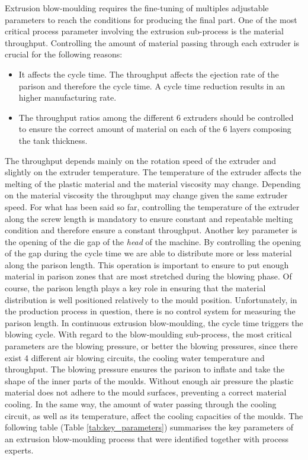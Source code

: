 Extrusion blow-moulding requires the fine-tuning of multiples adjustable parameters to reach the conditions for producing the final part. One of the most critical process parameter involving the extrusion sub-process is the material throughput. Controlling the amount of material passing through each extruder is crucial for the following reasons:  
%
\begin{itemize}
    \item It affects the cycle time. The throughput affects the ejection rate of the parison and therefore the cycle time. A cycle time reduction results in an higher manufacturing rate.
    \item The throughput ratios among the different 6 extruders should be controlled to ensure the correct amount of material on each of the 6 layers composing the tank thickness.
\end{itemize}
%
The throughput depends mainly on the rotation speed of the extruder and slightly on the extruder temperature. The temperature of the extruder affects the melting of the plastic material and the material viscosity may change. Depending on the material viscosity the throughput may change given the same extruder speed. For what has been said so far, controlling the temperature of the extruder along the screw length is mandatory to ensure constant and repeatable melting condition and therefore ensure a constant throughput. Another key parameter is the opening of the die gap of the \textit{head} of the machine. By controlling the opening of the gap during the cycle time we are able to distribute more or less material along the parison length. This operation is important to ensure to put enough material in parison zones that are most stretched during the blowing phase. Of course, the parison length plays a key role in ensuring that the material distribution is well positioned relatively to the mould position. Unfortunately, in the production process in question, there is no control system for measuring the parison length. In continuous extrusion blow-moulding, the cycle time triggers the blowing cycle. With regard to the blow-moulding sub-process, the most critical parameters are the blowing pressure, or better the blowing pressures, since there exist 4 different air blowing circuits, the cooling water temperature and throughput. The blowing pressure ensures the parison to inflate and take the shape of the inner parts of the moulds. Without enough air pressure the plastic material does not adhere to the mould surfaces, preventing a correct material cooling. In the same way, the amount of water passing through the cooling circuit, as well as its temperature, affect the cooling capacities of the moulds. The following table (Table \ref{tab:key_parameters}) summarises the key parameters of an extrusion blow-moulding process that were identified together with process experts.


